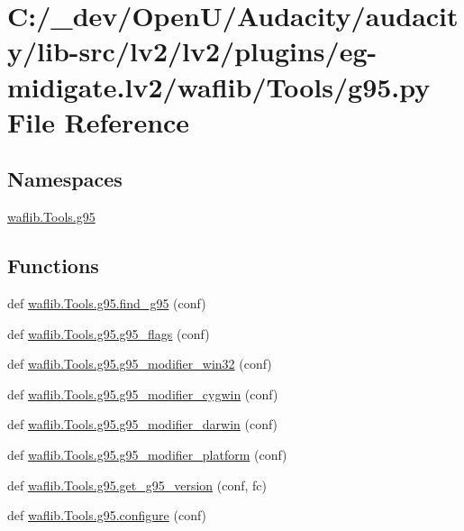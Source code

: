 \hypertarget{lv2_2plugins_2eg-midigate_8lv2_2waflib_2_tools_2g95_8py}{}\section{C\+:/\+\_\+dev/\+Open\+U/\+Audacity/audacity/lib-\/src/lv2/lv2/plugins/eg-\/midigate.lv2/waflib/\+Tools/g95.py File Reference}
\label{lv2_2plugins_2eg-midigate_8lv2_2waflib_2_tools_2g95_8py}
\subsection*{Namespaces}
\begin{DoxyCompactItemize}
\item 
 \hyperlink{namespacewaflib_1_1_tools_1_1g95}{waflib.\+Tools.\+g95}
\end{DoxyCompactItemize}
\subsection*{Functions}
\begin{DoxyCompactItemize}
\item 
def \hyperlink{namespacewaflib_1_1_tools_1_1g95_a3be6ad150899555106884ccd7f485782}{waflib.\+Tools.\+g95.\+find\+\_\+g95} (conf)
\item 
def \hyperlink{namespacewaflib_1_1_tools_1_1g95_a219eb212c9e3c16c14c4be4c75fe81cc}{waflib.\+Tools.\+g95.\+g95\+\_\+flags} (conf)
\item 
def \hyperlink{namespacewaflib_1_1_tools_1_1g95_a13f942cc0288d10a196243598d9ba608}{waflib.\+Tools.\+g95.\+g95\+\_\+modifier\+\_\+win32} (conf)
\item 
def \hyperlink{namespacewaflib_1_1_tools_1_1g95_a3363ec27e958d5ce39d5556234385475}{waflib.\+Tools.\+g95.\+g95\+\_\+modifier\+\_\+cygwin} (conf)
\item 
def \hyperlink{namespacewaflib_1_1_tools_1_1g95_a67982aa3652753344baa933e39fe4076}{waflib.\+Tools.\+g95.\+g95\+\_\+modifier\+\_\+darwin} (conf)
\item 
def \hyperlink{namespacewaflib_1_1_tools_1_1g95_a9faf0774c7c31790a714ca21fdb9806b}{waflib.\+Tools.\+g95.\+g95\+\_\+modifier\+\_\+platform} (conf)
\item 
def \hyperlink{namespacewaflib_1_1_tools_1_1g95_a753e499b2ec1d9c6960514b2f66c5b34}{waflib.\+Tools.\+g95.\+get\+\_\+g95\+\_\+version} (conf, fc)
\item 
def \hyperlink{namespacewaflib_1_1_tools_1_1g95_a7cb58685ba6d130068f6a04dc68383a1}{waflib.\+Tools.\+g95.\+configure} (conf)
\end{DoxyCompactItemize}
